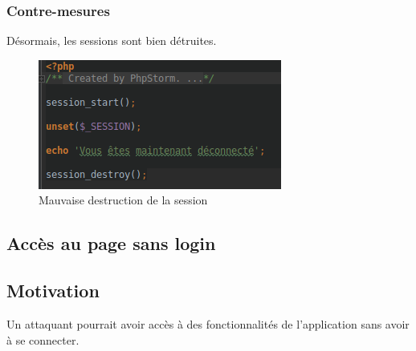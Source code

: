 \documentclass[12pt]{article}
\begin{document}
\subsubsection{Contre-mesures}
Désormais, les sessions sont bien détruites.

\begin{figure}[H]
\centering
\includegraphics[width=\linewidth]{images/sessionDestroy.png}
\caption{Mauvaise destruction de la session}
\end{figure}

\subsection{Accès au page sans login}
\subsection{Motivation}
Un attaquant pourrait avoir accès à des fonctionnalités de l'application sans avoir à se connecter. 
\end{document}
